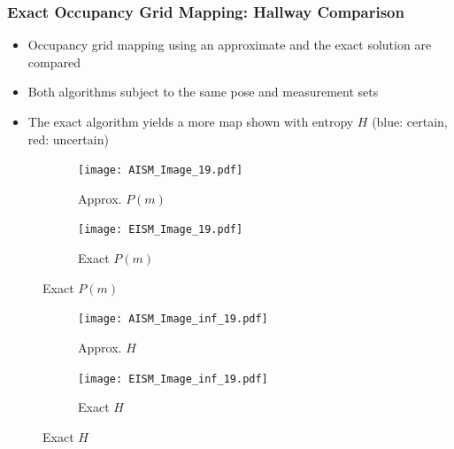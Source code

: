 \documentclass[11pt,professionalfonts,hyperref={pdftex,pdfpagemode=none,pdfstartview=FitH}]{beamer}
\renewcommand{\emph}[1]{\textit{\textbf{\color{blue}{#1}}}}
\begin{document}
\begin{frame}
\frametitle{Exact Occupancy Grid Mapping: Hallway Comparison}
\begin{minipage}[t]{0.4\textwidth}
\begin{itemize}
	\item Occupancy grid mapping using an approximate and the exact solution are compared
	\item Both algorithms subject to the same pose and measurement sets 
	\item The exact algorithm yields a more \emph{certain} map shown with entropy $H$ (blue: certain, red: uncertain)
\end{itemize}
\end{minipage}
	\begin{minipage}[t]{0.5\textwidth}
		\begin{figure}[!htbp]
		    \centering
		    \begin{subfigure}{0.5\textwidth}
		        \centering
		        \texttt{[image: AISM\_Image\_19.pdf]}
		        \caption*{Approx. $P(m)$}
		    \end{subfigure}
		    \hspace*{-0.1\textwidth}
		    \begin{subfigure}{0.5\textwidth}
		        \centering
		        \texttt{[image: EISM\_Image\_19.pdf]}
		        \caption*{Exact $P(m)$}
		    \end{subfigure}
		\end{figure}
		\vspace*{-.1\textwidth}
		\begin{figure}[!htbp]
		    \centering
		    \begin{subfigure}{0.5\textwidth}
		        \centering
		        \texttt{[image: AISM\_Image\_inf\_19.pdf]}
		        \caption*{Approx. $H$}
		    \end{subfigure}
		    \hspace*{-0.1\textwidth}
		    \begin{subfigure}{0.5\textwidth}
		        \centering
		        \texttt{[image: EISM\_Image\_inf\_19.pdf]}
		        \caption*{Exact $H$}
		    \end{subfigure}
		\end{figure}
	\end{minipage}



\end{frame}
\end{document}

